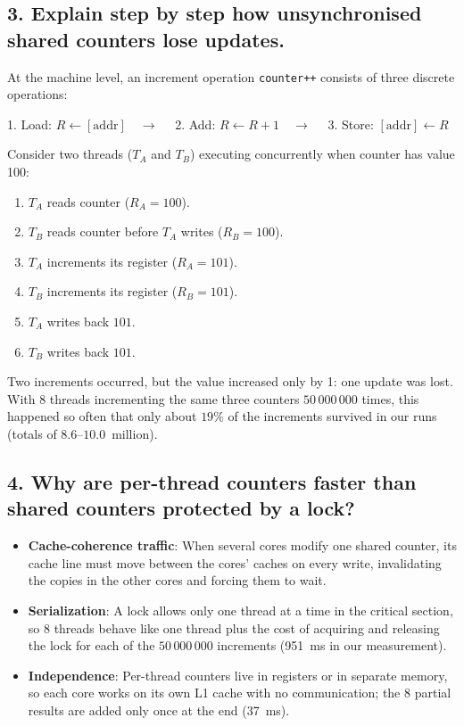 \documentclass[11pt,a4paper]{article}
\begin{document}
\subsection{3. Explain step by step how unsynchronised shared counters lose updates.}
At the machine level, an increment operation \texttt{counter++} consists of three discrete operations:
\begin{center}
1. Load: $R \leftarrow [\text{addr}] \quad \longrightarrow \quad$ 2. Add: $R \leftarrow R + 1 \quad \longrightarrow \quad$ 3. Store: $[\text{addr}] \leftarrow R$
\end{center}
Consider two threads ($T_A$ and $T_B$) executing concurrently when counter has value 100:
\begin{enumerate}
    \item $T_A$ reads counter ($R_A = 100$).
    \item $T_B$ reads counter before $T_A$ writes ($R_B = 100$).
    \item $T_A$ increments its register ($R_A = 101$).
    \item $T_B$ increments its register ($R_B = 101$).
    \item $T_A$ writes back $101$.
    \item $T_B$ writes back $101$.
\end{enumerate}
Two increments occurred, but the value increased only by 1: one update was lost. With 8 threads incrementing the same three counters $50\,000\,000$ times, this happened so often that only about $19\%$ of the increments survived in our runs (totals of $8.6$--$10.0$~million).

\subsection{4. Why are per-thread counters faster than shared counters protected by a lock?}
\begin{itemize}
    \item \textbf{Cache-coherence traffic}: When several cores modify one shared counter, its cache line must move between the cores' caches on every write, invalidating the copies in the other cores and forcing them to wait.
    \item \textbf{Serialization}: A lock allows only one thread at a time in the critical section, so 8 threads behave like one thread plus the cost of acquiring and releasing the lock for each of the $50\,000\,000$ increments (951~ms in our measurement).
    \item \textbf{Independence}: Per-thread counters live in registers or in separate memory, so each core works on its own L1 cache with no communication; the 8 partial results are added only once at the end (37~ms).
\end{itemize}
\end{document}
